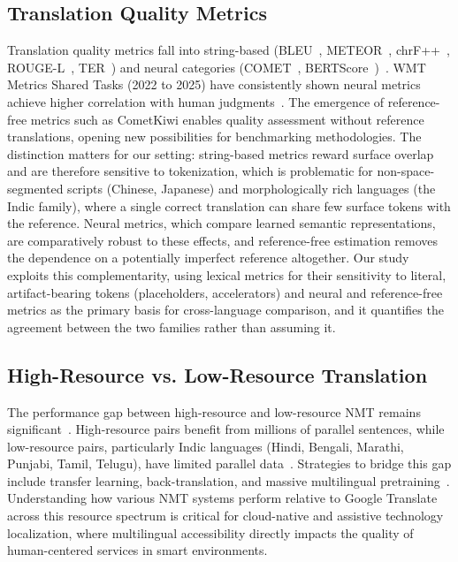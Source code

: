 \documentclass[pdflatex,sn-mathphys-num]{sn-jnl}
\begin{document}
\subsection{Translation Quality Metrics}

Translation quality metrics fall into string-based (BLEU~\cite{20}, METEOR~\cite{21}, chrF++~\cite{22}, ROUGE-L~\cite{23}, TER~\cite{24}) and neural categories (COMET~\cite{25}, BERTScore~\cite{26})~\cite{27}. WMT Metrics Shared Tasks (2022 to 2025) have consistently shown neural metrics achieve higher correlation with human judgments~\cite{27}. The emergence of reference-free metrics such as CometKiwi enables quality assessment without reference translations, opening new possibilities for benchmarking methodologies. The distinction matters for our setting: string-based metrics reward surface overlap and are therefore sensitive to tokenization, which is problematic for non-space-segmented scripts (Chinese, Japanese) and morphologically rich languages (the Indic family), where a single correct translation can share few surface tokens with the reference. Neural metrics, which compare learned semantic representations, are comparatively robust to these effects, and reference-free estimation removes the dependence on a potentially imperfect reference altogether. Our study exploits this complementarity, using lexical metrics for their sensitivity to literal, artifact-bearing tokens (placeholders, accelerators) and neural and reference-free metrics as the primary basis for cross-language comparison, and it quantifies the agreement between the two families rather than assuming it.

\subsection{High-Resource vs. Low-Resource Translation}

The performance gap between high-resource and low-resource NMT remains significant~\cite{17,18}. High-resource pairs benefit from millions of parallel sentences, while low-resource pairs, particularly Indic languages (Hindi, Bengali, Marathi, Punjabi, Tamil, Telugu), have limited parallel data~\cite{17}. Strategies to bridge this gap include transfer learning, back-translation, and massive multilingual pretraining~\cite{17}. Understanding how various NMT systems perform relative to Google Translate across this resource spectrum is critical for cloud-native and assistive technology localization, where multilingual accessibility directly impacts the quality of human-centered services in smart environments.
\end{document}
